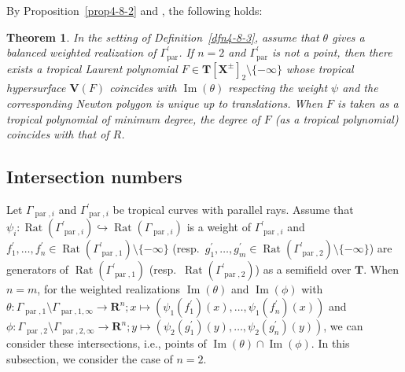 \documentclass[a4paper,12pt]{amsart}
\newtheorem{thm}[dfn]{Theorem}
\def\Gamma{\varGamma}
\begin{document}
By Proposition~\ref{prop4-8-2} and \cite[Proposition~3.3.10 and its proof]{Maclagan=Sturmfels}, the following holds:

\begin{thm}
    \label{thm4-8-1}
In the setting of Definition~\ref{dfn4-8-3}, assume that $\theta$ gives a balanced weighted realization of $\Gamma^{\prime}_{\operatorname{par}}$.
If $n = 2$ and $\Gamma^{\prime}_{\operatorname{par}}$ is not a point, then there exists a tropical Laurent polynomial $F \in \boldsymbol{T}[\boldsymbol{X}^{\pm}]_2 \setminus \{ -\infty \}$ whose tropical hypersurface $\boldsymbol{V}(F)$ coincides with $\operatorname{Im}(\theta)$ respecting the weight $\psi$ and the corresponding Newton polygon is unique up to translations.
When $F$ is taken as a tropical polynomial of minimum degree, the degree of $F$ (as a tropical polynomial) coincides with that of $R$.
\end{thm}

\subsection{Intersection numbers}
    \label{subsection4.9}

Let $\Gamma_{\operatorname{par}, i}$ and $\Gamma^{\prime}_{\operatorname{par}, i}$ be tropical curves with parallel rays.
Assume that $\psi_i : \operatorname{Rat}(\Gamma^{\prime}_{\operatorname{par}, i}) \hookrightarrow \operatorname{Rat}(\Gamma_{\operatorname{par}, i})$ is a weight of $\Gamma^{\prime}_{\operatorname{par}, i}$ and $f^{\prime}_1, \ldots, f^{\prime}_n \in \operatorname{Rat}(\Gamma^{\prime}_{\operatorname{par}, 1}) \setminus \{ -\infty \}$ (resp.~$g^{\prime}_1, \ldots, g^{\prime}_m \in \operatorname{Rat}(\Gamma^{\prime}_{\operatorname{par}, 2}) \setminus \{ -\infty \}$) are generators of $\operatorname{Rat}(\Gamma^{\prime}_{\operatorname{par}, 1})$ (resp.~$\operatorname{Rat}(\Gamma^{\prime}_{\operatorname{par}, 2})$) as a semifield over $\boldsymbol{T}$.
When $n = m$, for the weighted realizations $\operatorname{Im}(\theta)$ and $\operatorname{Im}(\phi)$ with $\theta : \Gamma_{\operatorname{par}, 1} \setminus \Gamma_{\operatorname{par}, 1, \infty} \to \boldsymbol{R}^n; x \mapsto (\psi_1(f^{\prime}_1)(x), \ldots, \psi_1(f^{\prime}_n)(x))$ and $\phi : \Gamma_{\operatorname{par}, 2} \setminus \Gamma_{\operatorname{par}, 2, \infty} \to \boldsymbol{R}^n; y \mapsto (\psi_2(g^{\prime}_1)(y), \ldots, \psi_2(g^{\prime}_n)(y))$, we can consider these intersections, i.e., points of $\operatorname{Im}(\theta) \cap \operatorname{Im}(\phi)$.
In this subsection, we consider the case of $n = 2$.
\end{document}
